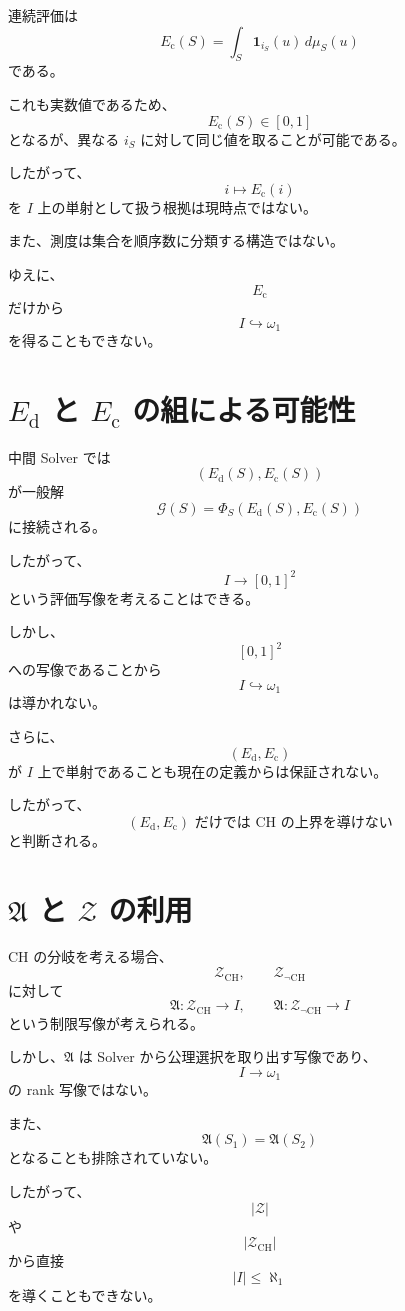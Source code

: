 \documentclass[a4paper,11pt]{article}
\begin{document}
連続評価は
\[
E_{\mathrm{c}}(S)
=
\int_S\mathbf 1_{i_S}(u)\,d\mu_S(u)
\]
である。

これも実数値であるため、
\[
E_{\mathrm{c}}(S)\in[0,1]
\]
となるが、異なる $i_S$ に対して同じ値を取ることが可能である。

したがって、
\[
i\mapsto E_{\mathrm{c}}(i)
\]
を $I$ 上の単射として扱う根拠は現時点ではない。

また、測度は集合を順序数に分類する構造ではない。

ゆえに、
\[
E_{\mathrm{c}}
\]
だけから
\[
I\hookrightarrow\omega_1
\]
を得ることもできない。

\section{$E_{\mathrm{d}}$ と $E_{\mathrm{c}}$ の組による可能性}

中間 Solver では
\[
\left(
E_{\mathrm{d}}(S),
E_{\mathrm{c}}(S)
\right)
\]
が一般解
\[
\mathcal{G}(S)
=
\Phi_S
\left(
E_{\mathrm{d}}(S),E_{\mathrm{c}}(S)
\right)
\]
に接続される。

したがって、
\[
I\to[0,1]^2
\]
という評価写像を考えることはできる。

しかし、
\[
[0,1]^2
\]
への写像であることから
\[
I\hookrightarrow\omega_1
\]
は導かれない。

さらに、
\[
(E_{\mathrm{d}},E_{\mathrm{c}})
\]
が $I$ 上で単射であることも現在の定義からは保証されない。

したがって、
\[
\boxed{
(E_{\mathrm{d}},E_{\mathrm{c}})
\text{ だけでは CH の上界を導けない}
}
\]
と判断される。

\section{$\mathfrak{A}$ と $\mathcal{Z}$ の利用}

CH の分岐を考える場合、
\[
\mathcal{Z}_{\mathrm{CH}},
\qquad
\mathcal{Z}_{\neg\mathrm{CH}}
\]
に対して
\[
\mathfrak{A}:
\mathcal{Z}_{\mathrm{CH}}\to I,
\qquad
\mathfrak{A}:
\mathcal{Z}_{\neg\mathrm{CH}}\to I
\]
という制限写像が考えられる。

しかし、$\mathfrak{A}$ は Solver から公理選択を取り出す写像であり、
\[
I\to\omega_1
\]
の rank 写像ではない。

また、
\[
\mathfrak{A}(S_1)=\mathfrak{A}(S_2)
\]
となることも排除されていない。

したがって、
\[
|\mathcal{Z}|
\]
や
\[
|\mathcal{Z}_{\mathrm{CH}}|
\]
から直接
\[
|I|\leq\aleph_1
\]
を導くこともできない。
\end{document}
